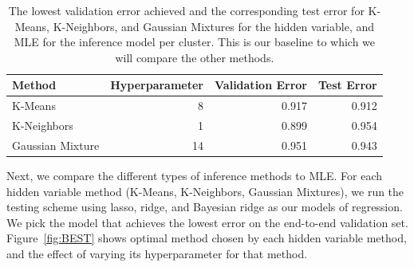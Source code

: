 \documentclass[11pt]{article}
\begin{document}
\begin{table}[h!]
    \begin{tabularx}{1.0\textwidth}{| X | r | r | r | }
        \hline
        Method & Hyperparameter & Validation Error & Test Error \\
        \hline
        K-Means & 8 & 0.917 & 0.912 \\
        K-Neighbors & 1 & 0.899 & 0.954 \\
        Gaussian Mixture & 14 & 0.951 & 0.943\\
        \hline
    \end{tabularx}
    \caption{The lowest validation error achieved and the corresponding test error for K-Means, K-Neighbors, and Gaussian Mixtures for the hidden variable, and MLE for the inference model per cluster. This is our baseline to which we will compare the other methods.}
    \label{tab:baseline}
\end{table}

Next, we compare the different types of inference methods to MLE. For each hidden variable method (K-Means, K-Neighbors, Gaussian Mixtures), we run the testing scheme using lasso, ridge, and Bayesian ridge as our models of regression. We pick the model that achieves the lowest error on the end-to-end validation set. Figure~\ref{fig:BEST} shows optimal method chosen by each hidden variable method, and the effect of varying its hyperparameter for that method. 
\end{document}
